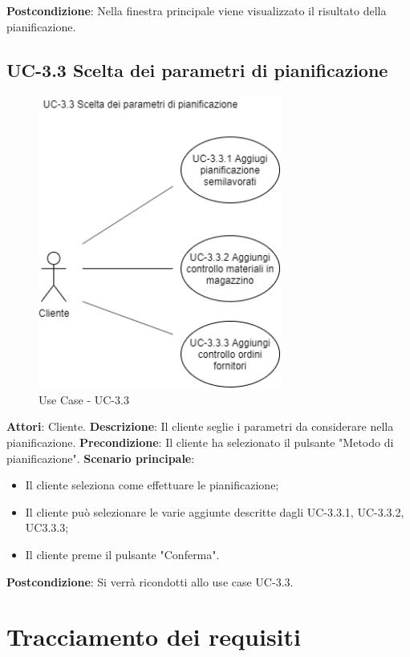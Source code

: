 \textbf{Postcondizione}: Nella finestra principale viene visualizzato il risultato della pianificazione.


\subsection*{UC-3.3 Scelta dei parametri di pianificazione}

\begin{figure}[H]
	\includegraphics[width=8cm]{immagini/UC2.png}
	\centering
	\caption{Use Case - UC-3.3}
\end{figure}

\textbf{Attori}: Cliente. \newline
\textbf{Descrizione}: Il cliente seglie i parametri da considerare nella pianificazione.\newline
\textbf{Precondizione}: Il cliente ha selezionato il pulsante "Metodo di pianificazione".\newline
\textbf{Scenario principale}: \begin{itemize}
    \item Il cliente seleziona come effettuare le pianificazione;
    \item Il cliente può selezionare le varie aggiunte descritte dagli UC-3.3.1, UC-3.3.2, UC3.3.3;
    \item Il cliente preme il pulsante "Conferma".
\end{itemize}
\textbf{Postcondizione}: Si verrà ricondotti allo use case UC-3.3.
\newpage
\section{Tracciamento dei requisiti}

